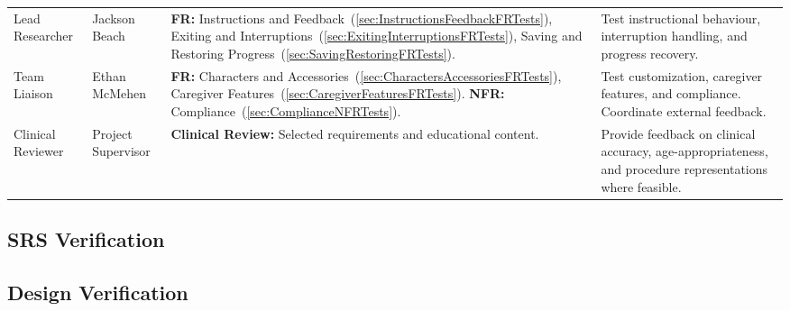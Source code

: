\documentclass[10pt,titlepage]{article}
\begin{document}
\begin{table}[H]
\begin{tabularx}{\textwidth}{
    @{}
    >{\raggedright\arraybackslash}p{2.4cm}
    >{\raggedright\arraybackslash}p{2.3cm}
    >{\raggedright\arraybackslash}p{5.2cm}
    >{\raggedright\arraybackslash}X
    @{}
}
\addlinespace[4pt]

Lead Researcher &
Jackson Beach &
\textbf{FR:}
Instructions and Feedback~(\ref{sec:InstructionsFeedbackFRTests}),
Exiting and Interruptions~(\ref{sec:ExitingInterruptionsFRTests}),
Saving and Restoring Progress~(\ref{sec:SavingRestoringFRTests}). &
Test instructional behaviour,
interruption handling, and
progress recovery. \\

\addlinespace[4pt]

Team Liaison &
Ethan McMehen &
\textbf{FR:}
Characters and Accessories~(\ref{sec:CharactersAccessoriesFRTests}),
Caregiver Features~(\ref{sec:CaregiverFeaturesFRTests}).
\newline
\textbf{NFR:}
Compliance~(\ref{sec:ComplianceNFRTests}). &
Test customization, caregiver
features, and compliance.
Coordinate external feedback. \\

\addlinespace[4pt]

Clinical Reviewer &
Project Supervisor &
\textbf{Clinical Review:}
Selected requirements and
educational content. &
Provide feedback on clinical accuracy,
age-appropriateness, and procedure
representations where feasible. \\

\bottomrule
\end{tabularx}
\end{table}


\subsection{SRS Verification}




\subsection{Design Verification}\label{sec:DesignVerification}
\end{document}
